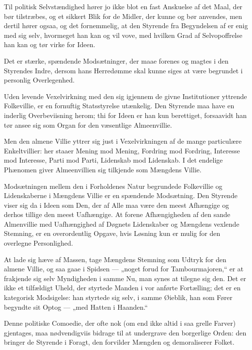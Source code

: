 \documentclass[12pt,a4paper]{book}
\newcommand{\apage}[1]{\marginnote{\footnotesize\textit{[#1]}}}
\begin{document}
Til politisk Selvstændighed hører jo ikke blot en fast Anskuelse af
det Maal, der bør tilstræbes, og et sikkert Blik for de Midler, der
kunne og bør anvendes, men dertil hører ogsaa, og det fornemmelig, at
den Styrende fra Begyndelsen af er enig med sig selv, hvormeget han
kan og vil vove, med hvilken Grad af Selvopoffrelse han kan og tør
virke for Ideen.

Det er stærke, spændende Modsætninger, der maae forenes og magtes i
den Styrendes Indre, dersom hans Herredømme skal kunne siges at være
begrundet i personlig Overlegenhed.

Uden levende Vexelvirkning med den sig igjennem de givne
Institutioner yttrende Folkevillie, er en fornuftig Statsstyrelse
utænkelig. Den Styrende maa have en inderlig \apage{63}
Overbeviisning herom; thi for Ideen er han kun berettiget,
forsaavidt han tør ansee sig som Organ for den væsentlige
Almeenvillie.

Men den almene Villie yttrer sig just i Vexelvirkningen af de mange
particulære Enkeltvillier: her staaer Mening mod Mening, Fordring mod
Fordring, Interesse mod Interesse, Parti mod Parti, Lidenskab mod
Lidenskab. I det endelige Phænomen giver Almeenvillien sig tilkjende
som Mængdens Villie.

Modsætningen mellem den i Forholdenes Natur begrundede Folkevillie
og Lidenskaberne i Mængdens Villie er en spændende Modsætning. Den
Styrende viser sig da i Ideen som Den, der af Alle maa være den
meest Afhængige og derhos tillige den meest Uafhængige. At forene
Afhængigheden af den sande Almenvillie med Uafhængighed af Døgnets
Lidenskaber og Mængdens vexlende Stemning, er en overordentlig
Opgave, hvis Løsning kun er mulig for den overlegne Personlighed.

At lade sig hæve af Massen, tage Mængdens Stemning som Udtryk for
den almene Villie, og saa gaae i Spidsen --- „noget forud for
Tambourmajoren,“ er at frakjende sig selv Myndigheden i samme Nu,
man synes at tilegne sig den. Det er ikke et tilfældigt Uheld, der
styrtede Manden i vor anførte Fortælling; det er en kategorisk
Modsigelse: han styrtede sig selv, i samme Øieblik, han som Fører
begyndte sit Optog --- „med Hatten i Haanden.“

Denne politiske Comoedie, der ofte nok (om end ikke altid i saa
grelle Farver) gjentages, maa nødvendigviis bidrage til at
undergrave den borgerlige Orden: den bringer de Styrende i Foragt,
den forvilder Mængden og demoraliserer Folket.
\end{document}
